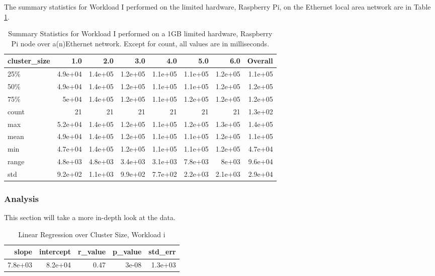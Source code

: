 The summary statistics for Workload I performed on the limited hardware, Raspberry Pi, on the Ethernet local area network are in Table \ref{table:summary_table_i_1GB_rp_eth}.
\begin{table}
\begin{tabular}{lrrrrrrr}
\toprule
cluster\_size &     1.0 &     2.0 &     3.0 &     4.0 &     5.0 &     6.0 &  Overall \\
\midrule
25\%   & 4.9e+04 & 1.4e+05 & 1.2e+05 & 1.1e+05 & 1.1e+05 & 1.2e+05 &  1.1e+05 \\
50\%   & 4.9e+04 & 1.4e+05 & 1.2e+05 & 1.1e+05 & 1.1e+05 & 1.2e+05 &  1.2e+05 \\
75\%   &   5e+04 & 1.4e+05 & 1.2e+05 & 1.1e+05 & 1.2e+05 & 1.2e+05 &  1.2e+05 \\
count &      21 &      21 &      21 &      21 &      21 &      21 &  1.3e+02 \\
max   & 5.2e+04 & 1.4e+05 & 1.2e+05 & 1.1e+05 & 1.2e+05 & 1.3e+05 &  1.4e+05 \\
mean  & 4.9e+04 & 1.4e+05 & 1.2e+05 & 1.1e+05 & 1.1e+05 & 1.2e+05 &  1.1e+05 \\
min   & 4.7e+04 & 1.4e+05 & 1.2e+05 & 1.1e+05 & 1.1e+05 & 1.2e+05 &  4.7e+04 \\
range & 4.8e+03 & 4.8e+03 & 3.4e+03 & 3.1e+03 & 7.8e+03 &   8e+03 &  9.6e+04 \\
std   & 9.2e+02 & 1.1e+03 & 9.9e+02 & 7.7e+02 & 2.2e+03 & 2.1e+03 &  2.9e+04 \\
\bottomrule
\end{tabular}
\caption{Summary Statistics for Workload I performed on a 1GB limited hardware, Raspberry Pi node over a(n)Ethernet network.  Except for count, all values are in milliseconds.}
\label{table:summary_table_i_1GB_rp_eth}
\end{table}



\subsubsection{Analysis}
This section will take a more in-depth look at the data.


\begin{table}[H]
\centering
\begin{tabular}{rrrrr}
\toprule
  slope &  intercept &  r\_value &  p\_value &  std\_err \\
\midrule
7.8e+03 &    8.2e+04 &     0.47 &    3e-08 &  1.3e+03 \\
\bottomrule
\end{tabular}
\caption{Linear Regression over Cluster Size, Workload i}
\label{table:rp_only_i}
\end{table}



